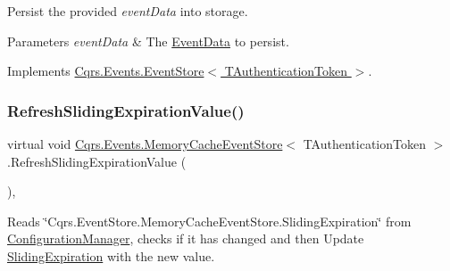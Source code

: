 Persist the provided {\itshape event\+Data}  into storage. 


\begin{DoxyParams}{Parameters}
{\em event\+Data} & The \hyperlink{classCqrs_1_1Events_1_1EventData}{Event\+Data} to persist.\\
\hline
\end{DoxyParams}


Implements \hyperlink{classCqrs_1_1Events_1_1EventStore_aedb71ca0ddf21220e323bc60ad7508cd_aedb71ca0ddf21220e323bc60ad7508cd}{Cqrs.\+Events.\+Event\+Store$<$ T\+Authentication\+Token $>$}.

\mbox{\label{classCqrs_1_1Events_1_1MemoryCacheEventStore_a4cac39acb87d9e25c4c090a384515d11_a4cac39acb87d9e25c4c090a384515d11}} 
\subsubsection{\texorpdfstring{Refresh\+Sliding\+Expiration\+Value()}{RefreshSlidingExpirationValue()}}
{\footnotesize\ttfamily virtual void \hyperlink{classCqrs_1_1Events_1_1MemoryCacheEventStore}{Cqrs.\+Events.\+Memory\+Cache\+Event\+Store}$<$ T\+Authentication\+Token $>$.Refresh\+Sliding\+Expiration\+Value (\begin{DoxyParamCaption}{ }\end{DoxyParamCaption})\hspace{0.3cm}{\ttfamily [protected]}, {\ttfamily [virtual]}}



Reads \char`\"{}\+Cqrs.\+Event\+Store.\+Memory\+Cache\+Event\+Store.\+Sliding\+Expiration\char`\"{} from \hyperlink{classCqrs_1_1Events_1_1MemoryCacheEventStore_a8a4fc4fa5d767e4d15344daf1ba7ea01_a8a4fc4fa5d767e4d15344daf1ba7ea01}{Configuration\+Manager}, checks if it has changed and then Update \hyperlink{classCqrs_1_1Events_1_1MemoryCacheEventStore_a93423872cdd702ee6257c0cc704c0c06_a93423872cdd702ee6257c0cc704c0c06}{Sliding\+Expiration} with the new value. 

\mbox{\label{classCqrs_1_1Events_1_1MemoryCacheEventStore_ac2a6da8b2faac7bd5f333bff592fc8f2_ac2a6da8b2faac7bd5f333bff592fc8f2}} 
